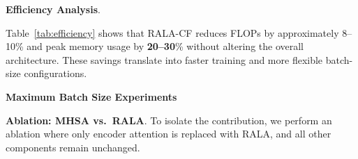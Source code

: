 \noindent \textbf{Efficiency Analysis}.

\begin{table}[h!]
\caption{Efficiency comparison between ChangeFormer and RALA-ChangeFormer ($256\times256$ inputs, batch size 16).}
\label{tab:efficiency}
\centering
{}
\end{table}

\noindent Table~\ref{tab:efficiency} shows that RALA-CF reduces FLOPs by approximately 8--10\% and peak memory usage by \textbf{20--30}\% without altering the overall architecture. These savings translate into faster training and more flexible batch-size configurations.

\noindent \textbf{Maximum Batch Size Experiments}

\begin{table}[h!]
\caption{Maximum batch size before OOM for different input resolutions. VRAM limit: 34--36 GB (A100 40 GB VRAM GPU).}
\label{tab:batch_multires}
\centering
{}
\end{table}

\noindent \textbf{Ablation: MHSA vs.\ RALA}. To isolate the contribution, we perform an ablation where only encoder attention is replaced with RALA, and all other components remain unchanged.

